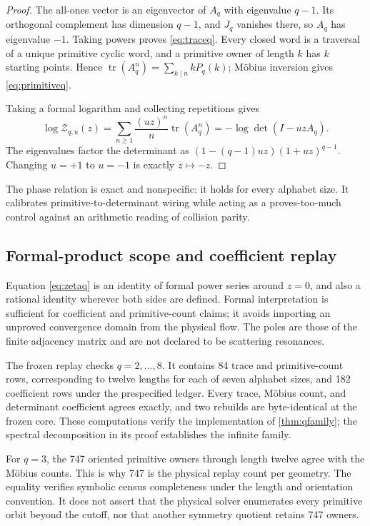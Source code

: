 \documentclass[11pt,a4paper]{article}
\theoremstyle{definition}
\theoremstyle{remark}
\newcommand{\tr}{\operatorname{tr}}
\newcommand{\Zeta}{\mathcal Z}
\begin{document}
\begin{proof}
The all-ones vector is an eigenvector of \(A_q\) with eigenvalue \(q-1\). Its orthogonal complement has dimension \(q-1\), and \(J_q\) vanishes there, so \(A_q\) has eigenvalue \(-1\). Taking powers proves \cref{eq:traceq}. Every closed word is a traversal of a unique primitive cyclic word, and a primitive owner of length \(k\) has \(k\) starting points. Hence
\(\tr(A_q^n)=\sum_{k\mid n}kP_q(k)\); Möbius inversion gives \cref{eq:primitiveq}.

Taking a formal logarithm and collecting repetitions gives
\[
 \log\Zeta_{q,u}(z)
 =\sum_{n\ge1}\frac{(uz)^n}{n}\tr(A_q^n)
 =-\log\det(I-uzA_q).
\]
The eigenvalues factor the determinant as
\((1-(q-1)uz)(1+uz)^{q-1}\). Changing \(u=+1\) to \(u=-1\) is exactly \(z\mapsto-z\).
\end{proof}

The phase relation is exact and nonspecific: it holds for every alphabet size. It calibrates primitive-to-determinant wiring while acting as a proves-too-much control against an arithmetic reading of collision parity.

\subsection{Formal-product scope and coefficient replay}

Equation \eqref{eq:zetaq} is an identity of formal power series around \(z=0\), and also a rational identity wherever both sides are defined. Formal interpretation is sufficient for coefficient and primitive-count claims; it avoids importing an unproved convergence domain from the physical flow. The poles are those of the finite adjacency matrix and are not declared to be scattering resonances.

The frozen replay checks \(q=2,\ldots,8\). It contains 84 trace and primitive-count rows, corresponding to twelve lengths for each of seven alphabet sizes, and 182 coefficient rows under the prespecified ledger. Every trace, Möbius count, and determinant coefficient agrees exactly, and two rebuilds are byte-identical at the frozen core. These computations verify the implementation of \cref{thm:qfamily}; the spectral decomposition in its proof establishes the infinite family.

For \(q=3\), the 747 oriented primitive owners through length twelve agree with the Möbius counts. This is why 747 is the physical replay count per geometry. The equality verifies symbolic census completeness under the length and orientation convention. It does not assert that the physical solver enumerates every primitive orbit beyond the cutoff, nor that another symmetry quotient retains 747 owners.
\end{document}
